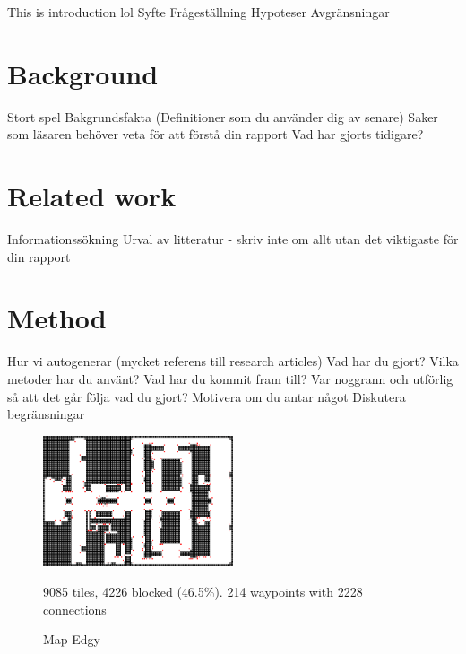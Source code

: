 \documentclass[a4paper]{article}
\begin{document}
This is introduction lol \newline
Syfte \newline
Frågeställning \newline
Hypoteser \newline
Avgränsningar

\section{Background}
Stort spel \newline
Bakgrundsfakta (Definitioner som du använder dig av senare) \newline
Saker som läsaren behöver veta för att förstå din rapport \newline
Vad har gjorts tidigare?

\section{Related work}
Informationssökning \newline
Urval av litteratur - skriv inte om allt utan det viktigaste för din rapport

\section{Method}
Hur vi autogenerar (mycket referens till research articles) \newline
Vad har du gjort? \newline
Vilka metoder har du använt? \newline
Vad har du kommit fram till? \newline
Var noggrann och utförlig så att det går följa vad du gjort? \newline
Motivera om du antar något \newline
Diskutera begränsningar

\makeatletter
\setlength{\@fptop}{0pt}
\makeatother

\begin{figure}[t!]
\centering
\includegraphics[width=0.5\textwidth,height=\textheight,keepaspectratio]{Data/Edgy.png}
\caption{Map Edgy}
9085 tiles, 4226 blocked (46.5\%). 214 waypoints with 2228 connections
\label{fig:Edgy}
\end{figure}
\end{document}
